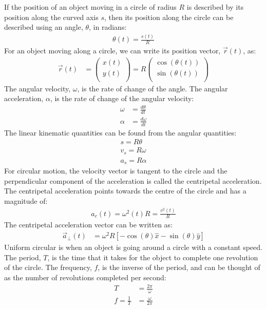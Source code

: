 \begin{chapterSummary}
If the position of an object moving in a circle of radius $R$ is described by its position along the curved axis $s$, then its position along the circle can be described using an angle, $\theta$, in radians:
\begin{align*}
\theta(t)=\frac{s(t)}{R}
\end{align*}
For an object moving along a circle, we can write its position vector, $\vec r(t)$, as:
\begin{align*}
\vec r(t)&= \begin{pmatrix}
          x(t) \\
          y(t) \\
        \end{pmatrix}
        =R \begin{pmatrix}
          \cos(\theta(t)) \\
          \sin(\theta(t)) \\
        \end{pmatrix}
\end{align*}
The angular velocity, $\omega$, is the rate of change of the angle. The angular acceleration, $\alpha$, is the rate of change of the angular velocity:
\begin{align*}
\omega &= \frac{d\theta}{dt}\\
\alpha &= \frac{d\omega}{dt}
\end{align*}
The linear kinematic quantities can be found from the angular quantities:
\begin{align*}
s=R\theta\\
v_s=R\omega\\
a_s=R\alpha
\end{align*}
For circular motion, the velocity vector is tangent to the circle and the perpendicular component of the acceleration is called the centripetal acceleration. The centripetal acceleration points towards the centre of the circle and has a magnitude of:
\begin{align*}
a_c(t) = \omega^2(t)R = \frac{v^2(t)}{R}
\end{align*}
The centripetal acceleration vector can be written as:
\begin{align*}
\vec a_{\bot}(t)&=\omega^2 R[-\cos(\theta)\hat x-\sin(\theta)\hat y]
\end{align*}
Uniform circular is when an object is going around a circle with a constant speed. The period, $T$, is the time that it takes for the object to complete one revolution of the circle. The frequency, $f$, is the inverse of the period, and can be thought of as the number of revolutions completed per second:
\begin{align*}
T&=\frac{2\pi}{\omega}\\
f=\frac{1}{T}&=\frac{\omega}{2\pi}
\end{align*}
\end{chapterSummary}

